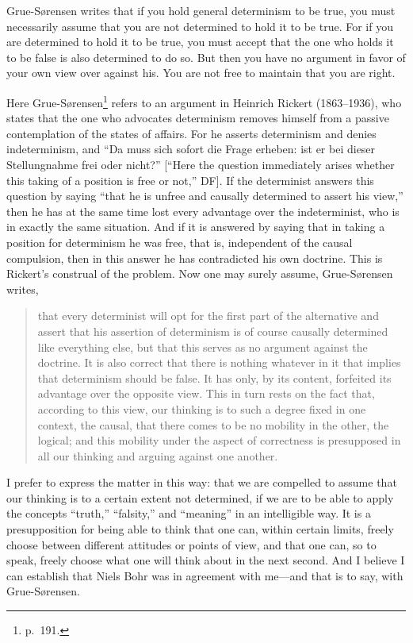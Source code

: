 \documentclass[12pt,a4paper]{book}
\begin{document}
Grue-Sørensen writes that if you hold general determinism to be true, you must necessarily assume that you are not determined to hold it to be true. For if you are determined to hold it to be true, you must accept that the one who holds it to be false is also determined to do so. But then you have no argument in favor of your own view over against his. You are not free to maintain that you are right.

Here Grue-Sørensen\footnote{p.~191.} refers to an argument in Heinrich Rickert (1863--1936), who states that the one who advocates determinism removes himself from a passive contemplation of the states of affairs. For he asserts determinism and denies indeterminism, and ``Da muss sich sofort die Frage erheben: ist er bei dieser Stellungnahme frei oder nicht?'' [``Here the question immediately arises whether this taking of a position is free or not,'' DF]. If the determinist answers this question by saying ``that he is unfree and causally determined to assert his view,'' then he has at the same time lost every advantage over the indeterminist, who is in exactly the same situation. And if it is answered by saying that in taking a position for determinism he was free, that is, independent of the causal compulsion, then in this answer he has contradicted his own doctrine. This is Rickert's construal of the problem. Now one may surely assume, Grue-Sørensen writes,

\begin{quote}
that every determinist will opt for the first part of the alternative and assert that his assertion of determinism is of course causally determined like everything else, but that this serves as no argument against the doctrine. It is also correct that there is nothing whatever in it that implies that determinism should be false. It has only, by its content, forfeited its advantage over the opposite view. This in turn rests on the fact that, according to this view, our thinking is to such a degree fixed in one context, the causal, that there comes to be no mobility in the other, the logical; and this mobility under the aspect of correctness is presupposed in all our thinking and arguing against one another.
\end{quote}

I prefer to express the matter in this way: that we are compelled to assume that our thinking is to a certain extent not determined, if we are to be able to apply the concepts ``truth,'' ``falsity,'' and ``meaning'' in an intelligible way. It is a presupposition for being able to think that one can, within certain limits, freely choose between different attitudes or points of view, and that one can, so to speak, freely choose what one will think about in the next second. And I believe I can establish that Niels Bohr was in agreement with me---and that is to say, with Grue-Sørensen.
\end{document}

